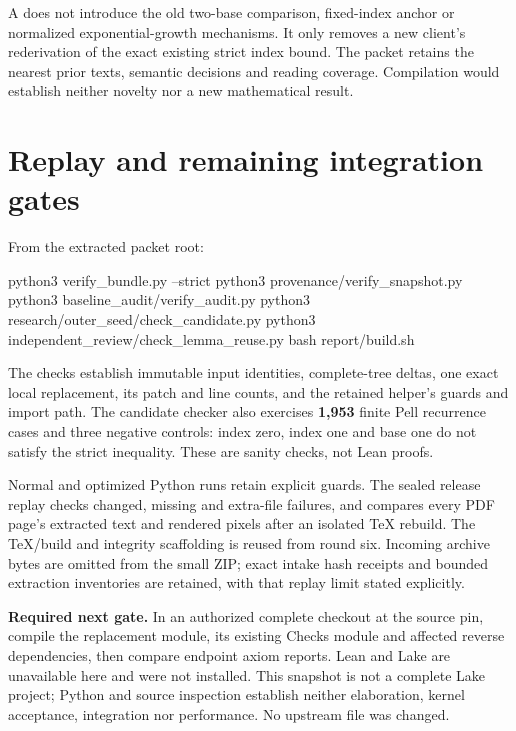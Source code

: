A does not introduce the old two-base comparison, fixed-index anchor or normalized exponential-growth mechanisms. It only removes a new client's rederivation of the exact existing strict index bound. The packet retains the nearest prior texts, semantic decisions and reading coverage. Compilation would establish neither novelty nor a new mathematical result.

\section{Replay and remaining integration gates}
From the extracted packet root:
\begin{Lean}
python3 verify_bundle.py --strict
python3 provenance/verify_snapshot.py
python3 baseline_audit/verify_audit.py
python3 research/outer_seed/check_candidate.py
python3 independent_review/check_lemma_reuse.py
bash report/build.sh
\end{Lean}

The checks establish immutable input identities, complete-tree deltas, one exact local replacement, its patch and line counts, and the retained helper's guards and import path. The candidate checker also exercises \textbf{1,953} finite Pell recurrence cases and three negative controls: index zero, index one and base one do not satisfy the strict inequality. These are sanity checks, not Lean proofs.

Normal and optimized Python runs retain explicit guards. The sealed release replay checks changed, missing and extra-file failures, and compares every PDF page's extracted text and rendered pixels after an isolated TeX rebuild. The TeX/build and integrity scaffolding is reused from round six. Incoming archive bytes are omitted from the small ZIP; exact intake hash receipts and bounded extraction inventories are retained, with that replay limit stated explicitly.

\textbf{Required next gate.} In an authorized complete checkout at the source pin, compile the replacement module, its existing Checks module and affected reverse dependencies, then compare endpoint axiom reports. Lean and Lake are unavailable here and were not installed. This snapshot is not a complete Lake project; Python and source inspection establish neither elaboration, kernel acceptance, integration nor performance. No upstream file was changed.


